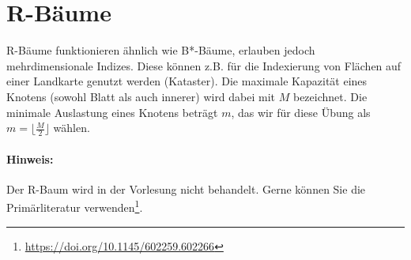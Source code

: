 \section{R-Bäume}
R-Bäume funktionieren ähnlich wie B*-Bäume, erlauben jedoch mehrdimensionale Indizes.
Diese können z.B. für die Indexierung von Flächen auf einer Landkarte genutzt werden (Kataster).
Die maximale Kapazität eines Knotens (sowohl Blatt als auch innerer) wird dabei mit $M$ bezeichnet.
Die minimale Auslastung eines Knotens beträgt $m$, das wir für diese Übung als $m = \lfloor\frac{M}{2}\rfloor$ wählen.

\paragraph{Hinweis:} Der R-Baum wird in der Vorlesung nicht behandelt.
Gerne können Sie die Primärliteratur verwenden\footnote{\url{https://doi.org/10.1145/602259.602266}}.

